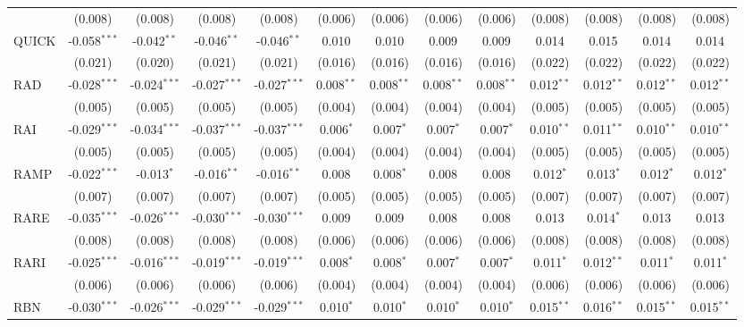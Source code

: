 \begin{table}[!htbp]
\begin{tabular}{@{\extracolsep{5pt}}lcccccccccccc}
  & (0.008) & (0.008) & (0.008) & (0.008) & (0.006) & (0.006) & (0.006) & (0.006) & (0.008) & (0.008) & (0.008) & (0.008) \\
 QUICK & -0.058$^{***}$ & -0.042$^{**}$ & -0.046$^{**}$ & -0.046$^{**}$ & 0.010$^{}$ & 0.010$^{}$ & 0.009$^{}$ & 0.009$^{}$ & 0.014$^{}$ & 0.015$^{}$ & 0.014$^{}$ & 0.014$^{}$ \\
  & (0.021) & (0.020) & (0.021) & (0.021) & (0.016) & (0.016) & (0.016) & (0.016) & (0.022) & (0.022) & (0.022) & (0.022) \\
 RAD & -0.028$^{***}$ & -0.024$^{***}$ & -0.027$^{***}$ & -0.027$^{***}$ & 0.008$^{**}$ & 0.008$^{**}$ & 0.008$^{**}$ & 0.008$^{**}$ & 0.012$^{**}$ & 0.012$^{**}$ & 0.012$^{**}$ & 0.012$^{**}$ \\
  & (0.005) & (0.005) & (0.005) & (0.005) & (0.004) & (0.004) & (0.004) & (0.004) & (0.005) & (0.005) & (0.005) & (0.005) \\
 RAI & -0.029$^{***}$ & -0.034$^{***}$ & -0.037$^{***}$ & -0.037$^{***}$ & 0.006$^{*}$ & 0.007$^{*}$ & 0.007$^{*}$ & 0.007$^{*}$ & 0.010$^{**}$ & 0.011$^{**}$ & 0.010$^{**}$ & 0.010$^{**}$ \\
  & (0.005) & (0.005) & (0.005) & (0.005) & (0.004) & (0.004) & (0.004) & (0.004) & (0.005) & (0.005) & (0.005) & (0.005) \\
 RAMP & -0.022$^{***}$ & -0.013$^{*}$ & -0.016$^{**}$ & -0.016$^{**}$ & 0.008$^{}$ & 0.008$^{*}$ & 0.008$^{}$ & 0.008$^{}$ & 0.012$^{*}$ & 0.013$^{*}$ & 0.012$^{*}$ & 0.012$^{*}$ \\
  & (0.007) & (0.007) & (0.007) & (0.007) & (0.005) & (0.005) & (0.005) & (0.005) & (0.007) & (0.007) & (0.007) & (0.007) \\
 RARE & -0.035$^{***}$ & -0.026$^{***}$ & -0.030$^{***}$ & -0.030$^{***}$ & 0.009$^{}$ & 0.009$^{}$ & 0.008$^{}$ & 0.008$^{}$ & 0.013$^{}$ & 0.014$^{*}$ & 0.013$^{}$ & 0.013$^{}$ \\
  & (0.008) & (0.008) & (0.008) & (0.008) & (0.006) & (0.006) & (0.006) & (0.006) & (0.008) & (0.008) & (0.008) & (0.008) \\
 RARI & -0.025$^{***}$ & -0.016$^{***}$ & -0.019$^{***}$ & -0.019$^{***}$ & 0.008$^{*}$ & 0.008$^{*}$ & 0.007$^{*}$ & 0.007$^{*}$ & 0.011$^{*}$ & 0.012$^{**}$ & 0.011$^{*}$ & 0.011$^{*}$ \\
  & (0.006) & (0.006) & (0.006) & (0.006) & (0.004) & (0.004) & (0.004) & (0.004) & (0.006) & (0.006) & (0.006) & (0.006) \\
 RBN & -0.030$^{***}$ & -0.026$^{***}$ & -0.029$^{***}$ & -0.029$^{***}$ & 0.010$^{*}$ & 0.010$^{*}$ & 0.010$^{*}$ & 0.010$^{*}$ & 0.015$^{**}$ & 0.016$^{**}$ & 0.015$^{**}$ & 0.015$^{**}$ \\

\end{tabular}
\end{table}
